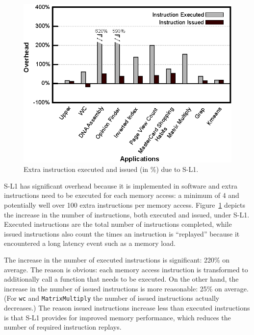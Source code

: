 \begin{figure}[t]
\center
\includegraphics[scale=0.93]{4instructionIssueOverhead.eps}
\vspace{-0.0cm}
\caption{\footnotesize\textnormal{Extra instruction executed and issued (in \%) due to S-L1.}}
\label{fig:instexecissuedoverhead}
\end{figure}

S-L1 has significant overhead because it is implemented in software and extra instructions need to be executed for each memory access: a minimum of 4 and potentially well over 100 extra instructions per memory access.
Figure~\ref{fig:instexecissuedoverhead} depicts the increase in the number of instructions, both executed and issued, under S-L1.
Executed instructions are the total number of instructions completed, while 
issued instructions also count the times an instruction is ``replayed'' because it
encountered a long latency event such as a memory load.

The increase in the number of executed instructions is significant: 220\% on average. 
The reason is obvious: each memory access instruction is transformed to additionally call a function that needs to be executed. 
On the other hand, the increase in the number of issued instructions is more reasonable: 25\% on average. 
(For \texttt{wc} and \texttt{MatrixMultiply} the number of issued instructions actually decreases.)
The reason issued instructions increase less than executed instructions is that S-L1 provides for improved memory performance, which reduces the number of required 
instruction replays.


